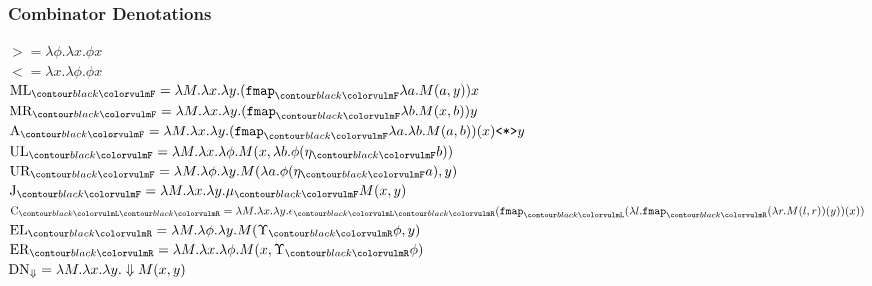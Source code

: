 \documentclass[math, english, info]{beamercours}
\begin{document}
\begin{frame}
	\frametitle{Combinator Denotations}
	\scriptsize
	\centering
	$	>                    = \lambda \phi. \lambda x. \phi x $\\[1.5ex]
	$ <                    = \lambda x. \lambda \phi. \phi x $\\[1.5ex]
	$ \combML_{\f{F}}      = \lambda M. \lambda x. \lambda y. (\fmap_{\f{F}} \lambda a. M(a, y)) x $\\[1.5ex]
	$ \combMR_{\f{F}}      = \lambda M. \lambda x. \lambda y. (\fmap_{\f{F}} \lambda b. M(x, b)) y $\\[1.5ex]
	$	\combA_{\f{F}}       = \lambda M. \lambda x. \lambda y. (\fmap_{\f{F}}\lambda a. \lambda b. M(a, b))(x) \texttt{<*>} y $\\[1.5ex]
	$	\combUL_{\f{F}}      = \lambda M. \lambda x. \lambda \phi. M(x, \lambda b. \phi(\eta_{\f{F}} b))$\\[1.5ex]
	$	\combUR_{\f{F}}      = \lambda M. \lambda \phi. \lambda y. M(\lambda a. \phi(\eta_{\f{F}} a),y) $\\[1.5ex]
	$ \combJ_{\f{F}}       = \lambda M. \lambda x. \lambda y. \mu_{\f{F}} M(x, y) $\\[1.5ex]
	$\combC_{\f{L}\f{R}}  = \lambda M. \lambda x. \lambda y. \epsilon_{\f{L}\f{R}}(\fmap_{\f{L}}(\lambda l. \fmap_{\f{R}}(\lambda r. M(l, r))(y)) (x))$\\[1.5ex]
	$	\combEL_{\f{R}}      = \lambda M. \lambda \phi. \lambda y. M(\Upsilon_{\f{R}} \phi, y)$\\[1.5ex]
	$	\combER_{\f{R}}      = \lambda M. \lambda x. \lambda \phi. M(x, \Upsilon_{\f{R}} \phi)$\\[1.5ex]
	$	\text{DN}_{\Downarrow} = \lambda M. \lambda x. \lambda y. \Downarrow M(x, y)$
\end{frame}
\end{document}
